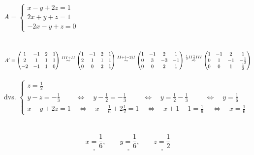 \documentclass{article}
\newcommand{\uu}[1]{\underline{\underline{#1}}}
\newcommand{\eq}{\quad\Longleftrightarrow\quad}
\newcommand{\eqto}[1]{\overset{#1}{\sim}}
\begin{document}
\(A = \begin{cases}
    x-y+2z=1\\2x+y+z=1\\-2x-y+z=0
\end{cases}\)
\\ \\ \\
\(A' = \begin{pmatrix}
    1&-1&2&1\\2&1&1&1\\-2&-1&1&0
\end{pmatrix}
\eqto{III+II}
\begin{pmatrix}
    1&-1&2&1\\2&1&1&1\\0&0&2&1
\end{pmatrix}
\eqto{II+(-2)I}
\begin{pmatrix}
    1&-1&2&1\\0&3&-3&-1\\0&0&2&1
\end{pmatrix}
\eqto{\frac{1}{3}II\\ \frac{1}{2}III}
\begin{pmatrix}
    1&-1&2&1\\0&1&-1&-\frac{1}{3}\\0&0&1&\frac{1}{2}
\end{pmatrix}
\) \\ \\

dvs.
\(\begin{cases}
    z = \frac{1}{2} \\
    y-z=-\frac{1}{3} \ \quad \eq y -\frac{1}{2}=-\frac{1}{3} \ \, \quad \eq y = \frac{1}{2}-\frac{1}{3} \ \ \quad \eq y = \frac{1}{6} \\
    x-y+2z=1 \eq x-\frac{1}{6}+2\frac{1}{2}=1 \eq x+1-1 = \frac{1}{6} \, \eq x = \frac{1}{6}
\end{cases}\)
\\ \\ \\
\[\uu{x = \frac{1}{6}}, \qquad \uu{y = \frac{1}{6}}, \qquad \uu{z = \frac{1}{2}}\]
\newpage
\end{document}
